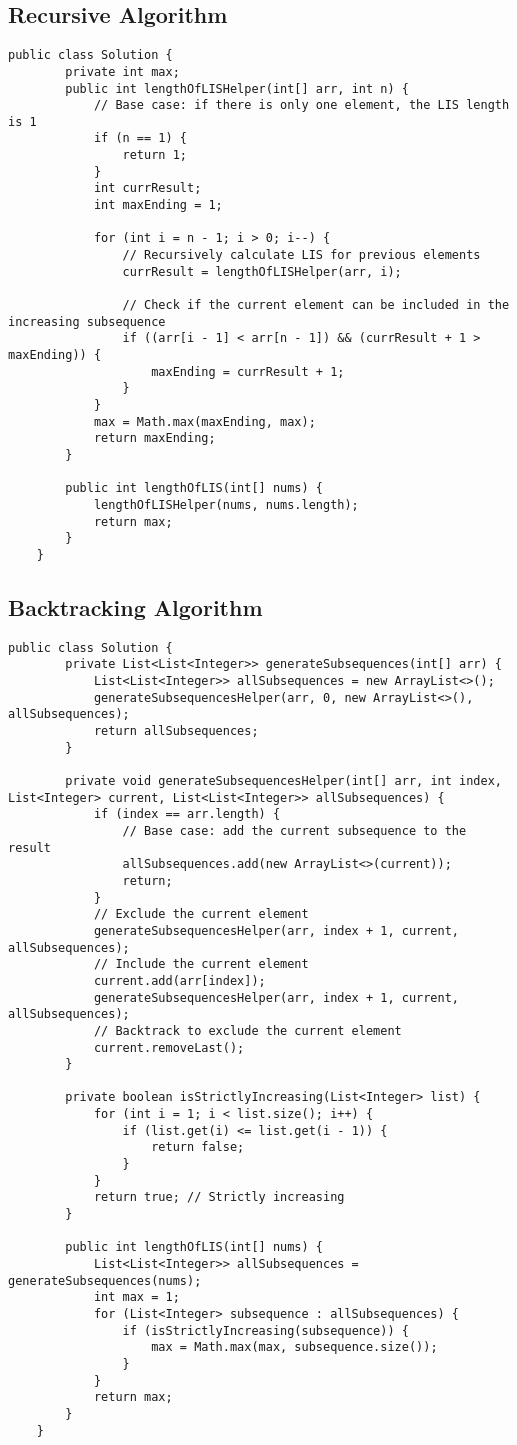 \documentclass{article}
\begin{document}
\subsection{Recursive Algorithm}
\begin{lstlisting}[caption=$\mathcal{O}(2^{n})$ Recursive Algorithm]
	public class Solution {
		private int max;
		public int lengthOfLISHelper(int[] arr, int n) {
			// Base case: if there is only one element, the LIS length is 1
			if (n == 1) {
				return 1;
			}
			int currResult;
			int maxEnding = 1;
			
			for (int i = n - 1; i > 0; i--) {
				// Recursively calculate LIS for previous elements
				currResult = lengthOfLISHelper(arr, i);
				
				// Check if the current element can be included in the increasing subsequence
				if ((arr[i - 1] < arr[n - 1]) && (currResult + 1 > maxEnding)) {
					maxEnding = currResult + 1;
				}
			}
			max = Math.max(maxEnding, max);
			return maxEnding;
		}
		
		public int lengthOfLIS(int[] nums) {
			lengthOfLISHelper(nums, nums.length);
			return max;
		}
	}
\end{lstlisting}

\clearpage %
\subsection{Backtracking Algorithm}
\begin{lstlisting}[caption=$\mathcal{O}(2^{n})$ Backtracking Algorithm]
	public class Solution {
		private List<List<Integer>> generateSubsequences(int[] arr) {
			List<List<Integer>> allSubsequences = new ArrayList<>();
			generateSubsequencesHelper(arr, 0, new ArrayList<>(), allSubsequences);
			return allSubsequences;
		}
		
		private void generateSubsequencesHelper(int[] arr, int index, List<Integer> current, List<List<Integer>> allSubsequences) {
			if (index == arr.length) {
				// Base case: add the current subsequence to the result
				allSubsequences.add(new ArrayList<>(current));
				return;
			}		
			// Exclude the current element
			generateSubsequencesHelper(arr, index + 1, current, allSubsequences);		
			// Include the current element
			current.add(arr[index]);
			generateSubsequencesHelper(arr, index + 1, current, allSubsequences);		
			// Backtrack to exclude the current element
			current.removeLast();
		}
		
		private boolean isStrictlyIncreasing(List<Integer> list) {
			for (int i = 1; i < list.size(); i++) {
				if (list.get(i) <= list.get(i - 1)) {
					return false;
				}
			}
			return true; // Strictly increasing
		}
		
		public int lengthOfLIS(int[] nums) {
			List<List<Integer>> allSubsequences = generateSubsequences(nums);
			int max = 1;
			for (List<Integer> subsequence : allSubsequences) {
				if (isStrictlyIncreasing(subsequence)) {
					max = Math.max(max, subsequence.size());
				}
			}
			return max;
		}
	}
\end{lstlisting}
\end{document}
